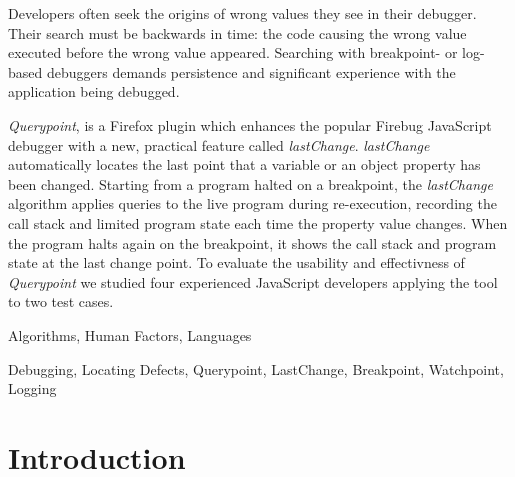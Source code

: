 \documentclass{sig-alternate}
\begin{document}

\maketitle

\begin{abstract}

\end{abstract}
Developers often seek the origins of wrong values they see in their
debugger. Their search must be backwards in time: the code causing the
wrong value executed before the wrong value appeared. Searching with
breakpoint- or log- based debuggers demands persistence and significant 
experience with the application being debugged.  

\textit{Querypoint}, is a Firefox plugin which enhances the popular 
Firebug JavaScript debugger with a new, practical feature called 
\textit{lastChange}. \textit{lastChange} automatically locates the last point that 
a variable or an object property has been changed. Starting from a 
program halted on a breakpoint, the \textit{lastChange} algorithm 
applies queries to the live program during re-execution, recording 
the call stack and limited program state each time 
the property value changes. When the program halts again on the breakpoint, 
it shows the call stack and program state at the last change point. To evaluate the usability and effectivness 
of \textit{Querypoint} we studied four experienced JavaScript developers applying the tool to two test cases.



\terms
{Algorithms, Human Factors, Languages}

\keywords
{Debugging, Locating Defects, Querypoint, LastChange, Breakpoint,
 Watchpoint, Logging}

\section{Introduction}
\end{document}
